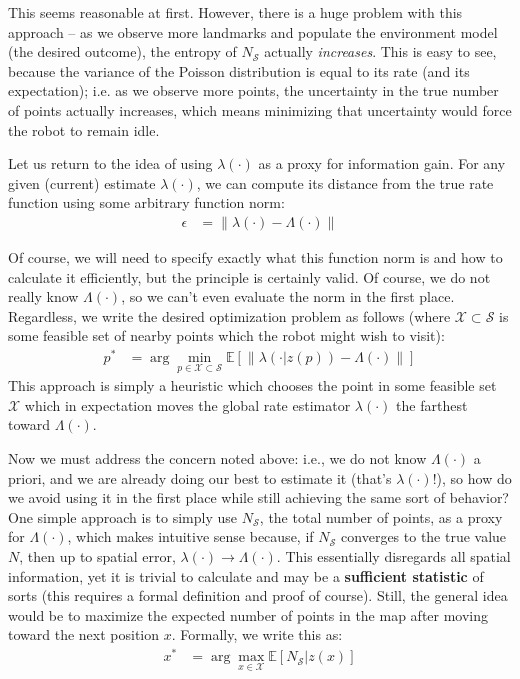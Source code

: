 \documentclass[12pt]{article}
\begin{document}
This seems reasonable at first. However, there is a huge problem with this approach -- as we observe more landmarks and populate the environment model (the desired outcome), the entropy of $N_{\mathcal{S}}$ actually \textit{increases}. This is easy to see, because the variance of the Poisson distribution is equal to its rate (and its expectation); i.e. as we observe more points, the uncertainty in the true number of points actually increases, which means minimizing that uncertainty would force the robot to remain idle.

Let us return to the idea of using $\lambda(\cdot)$ as a proxy for information gain. For any given (current) estimate $\lambda(\cdot)$, we can compute its distance from the true rate function using some arbitrary function norm:
\begin{align}
  \epsilon &= \|\lambda(\cdot) - \Lambda(\cdot)\|
\end{align}

Of course, we will need to specify exactly what this function norm is and how to calculate it efficiently, but the principle is certainly valid. Of course, we do not really know $\Lambda(\cdot)$, so we can't even evaluate the norm in the first place. Regardless, we write the desired optimization problem as follows (where $\mathcal{X} \subset \mathcal{S}$ is some feasible set of nearby points which the robot might wish to visit):
\begin{align}
  p^* &= \arg \min_{p \in \mathcal{X} \subset \mathcal{S}}
  \mathbb{E}[\|\lambda(\cdot | z(p)) - \Lambda(\cdot)\|]
\end{align}
This approach is simply a heuristic which chooses the point in some feasible set $\mathcal{X}$ which in expectation moves the global rate estimator $\lambda(\cdot)$ the farthest toward $\Lambda(\cdot)$.

Now we must address the concern noted above: i.e., we do not know $\Lambda(\cdot)$ a priori, and we are already doing our best to estimate it (that's $\lambda(\cdot)$!), so how do we avoid using it in the first place while still achieving the same sort of behavior? One simple approach is to simply use $N_{\mathcal{S}}$, the total number of points, as a proxy for $\Lambda(\cdot)$, which makes intuitive sense because, if $N_{\mathcal{S}}$ converges to the true value $N$, then up to spatial error, $\lambda(\cdot) \rightarrow \Lambda(\cdot)$. This essentially disregards all spatial information, yet it is trivial to calculate and may be a \textbf{sufficient statistic} of sorts (this requires a formal definition and proof of course). Still, the general idea would be to maximize the expected number of points in the map after moving toward the next position $x$. Formally, we write this as:
\begin{align}
  x^* &= \arg \max_{x \in \mathcal{X}} \mathbb{E}[N_{\mathcal{S}} | z(x)]
\end{align}
\end{document}
